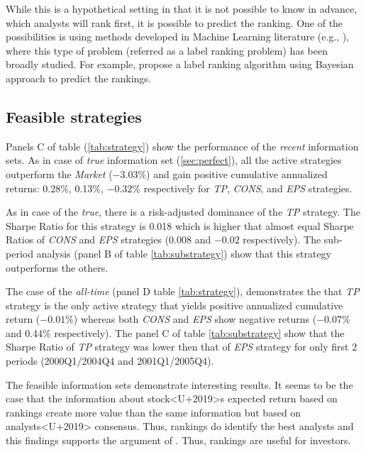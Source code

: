 \documentclass{article}
\newcommand{\tr}{\textit{true}}
\newcommand{\naive}{\textit{recent}}
\newcommand{\default}{\textit{all-time}}
\begin{document}
While this is a hypothetical setting in that it is not possible to know in advance, which analysts will rank first, it is possible to predict the ranking. One of the possibilities is using methods developed in Machine Learning literature (e.g., \cite{aiguzhinov2010,brazdil2003}), where this type of problem (referred as a label ranking problem) has been broadly studied. For example, \cite{aiguzhinov2010} propose a label ranking algorithm using Bayesian approach to predict the rankings.



\subsection{Feasible strategies}
Panels C of table (\ref{tab:strategy}) show the performance of the \naive{} information sets. As in case of \tr{} information set (\ref{sec:perfect}), all the active strategies outperform the \textit{Market} (\ensuremath{-3.03}\%)  and gain positive cumulative annualized returns: 0.28\%,  0.13\%, \ensuremath{-0.32}\% respectively for \textit{TP}, \textit{CONS}, and \textit{EPS} strategies.

As in case of the \tr{}, there is a risk-adjusted dominance of the \textit{TP} strategy. The Sharpe Ratio for this strategy is 0.018 which is higher that almost equal Sharpe Ratios of \textit{CONS} and \textit{EPS} strategies  (0.008 and \ensuremath{-0.02} respectively). The sub-period analysis (panel B of table \ref{tab:substrategy}) show that this strategy outperforms the others.


The case of the \default{} (panel D table \ref{tab:strategy}), demonstrates the that \textit{TP} strategy is the only active strategy that yields positive annualized cumulative return (\ensuremath{-0.01}\%) whereas both  \textit{CONS} and \textit{EPS} show negative returns (\ensuremath{-0.07}\% and 0.44\% respectively). The panel C of table \ref{tab:substrategy} show that the Sharpe Ratio of \textit{TP} strategy was lower then that of \textit{EPS} strategy for only first 2 periods (2000Q1/2004Q4 and 2001Q1/2005Q4).

The feasible information sets demonstrate interesting results. It seems to be the case that the information about stock<U+2019>s expected return based on rankings create more value than the same information but based on analysts<U+2019> consensus. Thus, rankings do identify the best analysts and this findings supports the argument of \cite{desai2000ass}. Thus, rankings are useful for investors.
\end{document}
